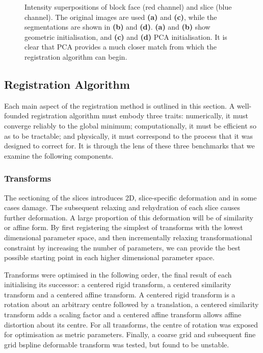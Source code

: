 \begin{figure}[htbp]
      \caption{Intensity superpositions of block face (red channel) and slice (blue channel). The original images are used \textbf{(a)} and \textbf{(c)}, while the segmentations are shown in \textbf{(b)} and \textbf{(d)}. \textbf{(a)} and \textbf{(b)} show geometric initialisation, and \textbf{(c)} and \textbf{(d)} PCA initialisation. It is clear that PCA provides a much closer match from which the registration algorithm can begin.}
      \label{fig:582_pca}
    \end{figure}
    
  
	\subsection{Registration Algorithm} %
  \label{sub:registration_algorithm}
    Each main aspect of the registration method is outlined in this section. A well-founded registration algorithm must embody three traits: numerically, it must converge reliably to the global minimum; computationally, it must be efficient so as to be tractable; and physically, it must correspond to the process that it was designed to correct for. It is through the lens of these three benchmarks that we examine the following components.
    
    \subsubsection{Transforms} %
    \label{ssub:transforms}
			The sectioning of the slices introduces 2D, slice-specific deformation and in some cases damage. The subsequent relaxing and rehydration of each slice causes further deformation. A large proportion of this deformation will be of similarity or affine form. By first registering the simplest of transforms with the lowest dimensional parameter space, and then incrementally relaxing transformational constraint by increasing the number of parameters, we can provide the best possible starting point in each higher dimensional parameter space.
			
      Transforms were optimised in the following order, the final result of each initialising its successor: a centered rigid transform, a centered similarity transform and a centered affine transform. A centered rigid transform is a rotation about an arbitrary centre followed by a translation, a centered similarity transform adds a scaling factor and a centered affine transform allows affine distortion about its centre.  For all transforms, the centre of rotation was exposed for optimisation as metric parameters. Finally, a coarse grid and subsequent fine grid bspline deformable transform was tested, but found to be unstable.
    
